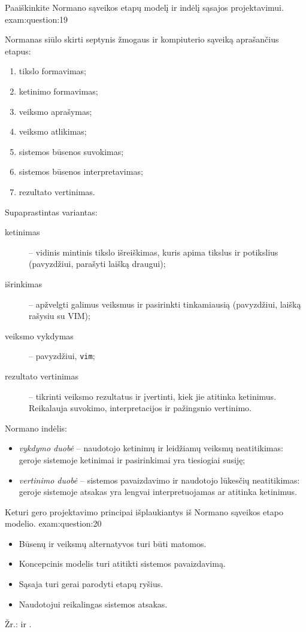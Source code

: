 \begin{question}{%
  Paaiškinkite Normano sąveikos etapų modelį ir indėlį sąsajos
  projektavimui.
  }{exam:question:19}

  Normanas siūlo skirti septynis žmogaus ir kompiuterio sąveiką aprašančius
  etapus\cite[135]{konspektas}:
  \begin{enumerate}
    \item tikslo formavimas;
    \item ketinimo formavimas;
    \item veiksmo aprašymas;
    \item veiksmo atlikimas;
    \item sistemos būsenos suvokimas;
    \item sistemos būsenos interpretavimas;
    \item rezultato vertinimas.
  \end{enumerate}

  Supaprastintas variantas\cite[4-5]{skaidres-9}:
  \begin{description}
    \item[ketinimas] – vidinis mintinis tikslo išreiškimas, kuris apima
      tikslus ir potikslius (pavyzdžiui, parašyti laišką draugui);
    \item[išrinkimas] – apžvelgti galimus veiksmus ir pasirinkti
      tinkamiausią (pavyzdžiui, laišką rašysiu su VIM);
    \item[veiksmo vykdymas] – pavyzdžiui, \verb|vim|;
    \item[rezultato vertinimas] – tikrinti veiksmo rezultatus ir įvertinti,
      kiek jie atitinka ketinimus. Reikalauja suvokimo, interpretacijos
      ir pažingsnio vertinimo.
  \end{description}

  Normano indėlis\cite[7]{skaidres-9}:
  \begin{itemize}
    \item \emph{vykdymo duobė}  – naudotojo ketinimų
      ir leidžiamų veiksmų neatitikimas: geroje sistemoje ketinimai
      ir pasirinkimai yra tiesiogiai susiję;
    \item \emph{vertinimo duobė}  – sistemos
      pavaizdavimo ir naudotojo lūkesčių neatitikimas: geroje sistemoje
      atsakas yra lengvai interpretuojamas ar atitinka ketinimus.
  \end{itemize}

\end{question}

\begin{question}{%
  Keturi gero projektavimo principai išplaukiantys iš Normano sąveikos
  etapo modelio.
  }{exam:question:20}
  \begin{itemize}
    \item Būsenų ir veiksmų alternatyvos turi būti matomos.
    \item Koncepcinis modelis turi atitikti sistemos pavaizdavimą.
    \item Sąsaja turi gerai parodyti etapų ryšius.
    \item Naudotojui reikalingas sistemos atsakas.
  \end{itemize}
  Žr.: \cite[135]{konspektas} ir \cite[10]{skaidres-9}.
\end{question}
